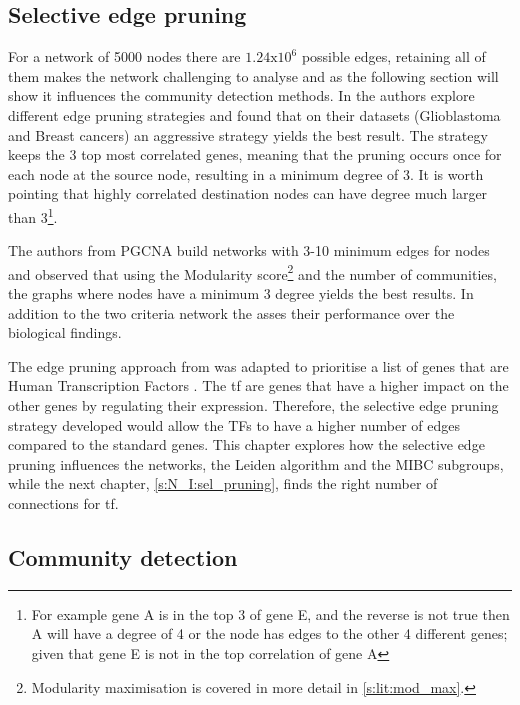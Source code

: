 \subsection{Selective edge pruning} \label{s:N_I:methods_edge_pruning}

For a network of 5000 nodes there are $1.24\text{x}10^6$ possible edges, retaining all of them makes the network challenging to analyse and as the following section will show it influences the community detection methods. In \citet{Care2019-ij} the authors explore different edge pruning strategies and found that on their datasets (Glioblastoma and Breast cancers) an aggressive strategy yields the best result. The strategy keeps the 3 top most correlated genes, meaning that the pruning occurs once for each node at the source node, resulting in a minimum degree of 3. It is worth pointing that highly correlated destination nodes can have degree much larger than 3\footnote{For example gene A is in the top 3 of gene E, and the reverse is not true then A will have a degree of 4 or the node has edges to the other 4 different genes; given that gene E is not in the top correlation of gene A}. 

The authors from PGCNA build networks with 3-10 minimum edges for nodes and observed that using the Modularity score\footnote{Modularity maximisation is covered in more detail in \cref{s:lit:mod_max}.} and the number of communities, the graphs where nodes have a minimum 3 degree yields the best results. In addition to the two criteria network the \citet{Care2019-ij} asses their performance over the biological findings.

The edge pruning approach from \citet{Care2019-ij} was adapted to prioritise a list of genes that are Human Transcription Factors \citet{Lambert2018-el}. The \acrlong{tf} are genes that have a higher impact on the other genes by regulating their expression. Therefore, the selective edge pruning strategy developed would allow the TFs to have a higher number of edges compared to the standard genes. This chapter explores how the selective edge pruning influences the networks, the Leiden algorithm and the MIBC subgroups, while the next chapter, \cref{s:N_I:sel_pruning}, finds the right number of connections for \acrshort{tf}.

\subsection{Community detection} \label{s:N_I:methods_comm_detection}


